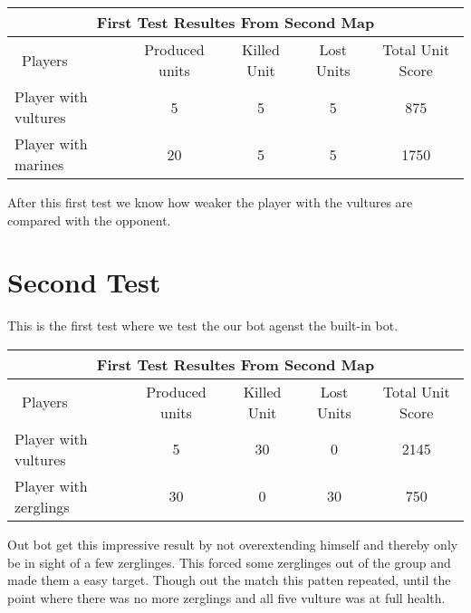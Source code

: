 \begin{centering}
 \begin{tabular}{|l||c|c|c|c|}
	\multicolumn{5}{c}{First Test Resultes From Second Map} \\
	\hline
	\ Players & Produced units & Killed Unit & Lost Units &  Total Unit Score \\
	\hline
	\hline
		Player with vultures & 5 & 5 & 5  & 875\\
	\hline
		Player with marines & 20 & 5 & 5 & 1750\\
	\hline

\end{tabular}
\end{centering}

After this first test we know how weaker the player with the vultures are compared with the opponent.

\section{Second Test}
This is the first test where we test the our bot agenst the built-in bot. 

\begin{centering}
 \begin{tabular}{|l||c|c|c|c|}
	\multicolumn{5}{c}{First Test Resultes From Second Map} \\
	\hline
	\ Players & Produced units & Killed Unit & Lost Units &  Total Unit Score \\
	\hline
	\hline
		Player with vultures & 5 & 30 & 0  & 2145\\
	\hline
		Player with zerglings & 30 & 0 & 30 & 750\\
	\hline

\end{tabular}
\end{centering}
Out bot get this impressive result by not overextending himself and thereby only be in sight of a few zerglinges. This forced some zerglinges out
of the group and made them a easy target. Though out the match this patten repeated, until the point where there was no more zerglings and all
five vulture was at full health.
